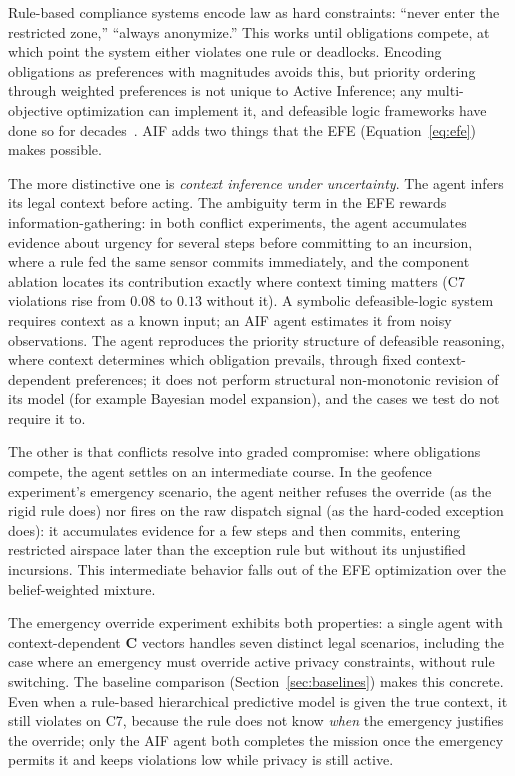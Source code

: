 \documentclass[10pt,twocolumn]{article}
\begin{document}
Rule-based compliance systems encode law as hard constraints: ``never enter the restricted zone,'' ``always anonymize.'' This works until obligations compete, at which point the system either violates one rule or deadlocks. Encoding obligations as preferences with magnitudes avoids this, but priority ordering through weighted preferences is not unique to Active Inference; any multi-objective optimization can implement it, and defeasible logic frameworks have done so for decades~\cite{prakken2015}. AIF adds two things that the EFE (Equation~\ref{eq:efe}) makes possible.

The more distinctive one is \textit{context inference under uncertainty}. The agent infers its legal context before acting. The ambiguity term in the EFE rewards information-gathering: in both conflict experiments, the agent accumulates evidence about urgency for several steps before committing to an incursion, where a rule fed the same sensor commits immediately, and the component ablation locates its contribution exactly where context timing matters (C7 violations rise from $0.08$ to $0.13$ without it). A symbolic defeasible-logic system requires context as a known input; an AIF agent estimates it from noisy observations. The agent reproduces the priority structure of defeasible reasoning, where context determines which obligation prevails, through fixed context-dependent preferences; it does not perform structural non-monotonic revision of its model (for example Bayesian model expansion), and the cases we test do not require it to.

The other is that conflicts resolve into graded compromise: where obligations compete, the agent settles on an intermediate course. In the geofence experiment's emergency scenario, the agent neither refuses the override (as the rigid rule does) nor fires on the raw dispatch signal (as the hard-coded exception does): it accumulates evidence for a few steps and then commits, entering restricted airspace later than the exception rule but without its unjustified incursions. This intermediate behavior falls out of the EFE optimization over the belief-weighted mixture.

The emergency override experiment exhibits both properties: a single agent with context-dependent $\mathbf{C}$ vectors handles seven distinct legal scenarios, including the case where an emergency must override active privacy constraints, without rule switching. The baseline comparison (Section~\ref{sec:baselines}) makes this concrete. Even when a rule-based hierarchical predictive model is given the true context, it still violates on C7, because the rule does not know \textit{when} the emergency justifies the override; only the AIF agent both completes the mission once the emergency permits it and keeps violations low while privacy is still active.
\end{document}
